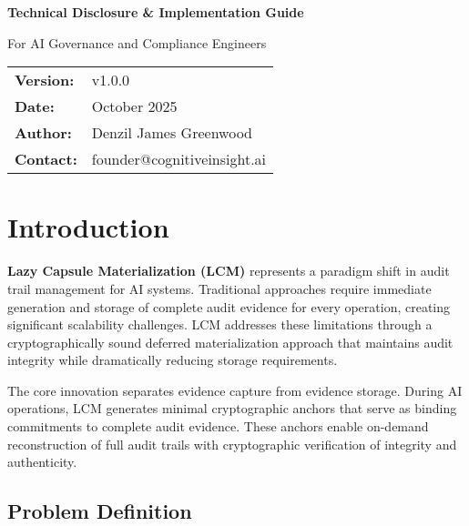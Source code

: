 \documentclass[12pt,a4paper]{article}
\begin{document}
\begin{titlepage}
\begin{center}
\end{center}

\ciafhugeSpace

{\large\bfseries Technical Disclosure \& Implementation Guide}

\ciafbigspace
{\large For AI Governance and Compliance Engineers}

\vfill

\begin{tabular}{ll}
\textbf{Version:} & v1.0.0 \\
\textbf{Date:} & October 2025 \\
\textbf{Author:} & Denzil James Greenwood \\
\textbf{Contact:} & founder@cognitiveinsight.ai \\
\end{tabular}

\end{titlepage}

\tableofcontents
\newpage

\section{Introduction}

\begin{executivebox}
\textbf{Lazy Capsule Materialization (LCM)} represents a paradigm shift in audit trail management for AI systems. Traditional approaches require immediate generation and storage of complete audit evidence for every operation, creating significant scalability challenges. LCM addresses these limitations through a cryptographically sound deferred materialization approach that maintains audit integrity while dramatically reducing storage requirements.
\end{executivebox}

The core innovation separates evidence capture from evidence storage. During AI operations, LCM generates minimal cryptographic anchors that serve as binding commitments to complete audit evidence. These anchors enable on-demand reconstruction of full audit trails with cryptographic verification of integrity and authenticity.

\subsection{Problem Definition}
\end{document}
